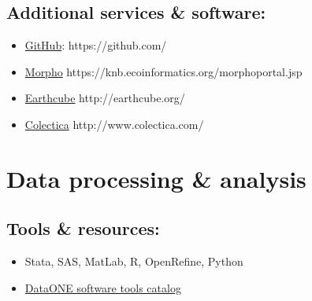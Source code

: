 \documentclass{tufte-handout}
\begin{document}
\subsection{Additional services \& software:}\label{additional-services-software}

\begin{itemize}
\item
  \href{https://github.com/}{GitHub}: https://github.com/
\item
  \href{https://knb.ecoinformatics.org/morphoportal.jsp}{Morpho}
  https://knb.ecoinformatics.org/morphoportal.jsp 
\item
  \href{http://earthcube.org/}{Earthcube} http://earthcube.org/
\item
  \href{http://www.colectica.com/}{Colectica} http://www.colectica.com/
\end{itemize}



\section{Data processing \& analysis}\label{data-processing-analysis}

\subsection{Tools \& resources:}\label{what-tools-and-resources-are-available-1}
\begin{itemize}
\itemsep1pt\parskip0pt
\item
  Stata, SAS, MatLab, R, OpenRefine, Python
\item
  \href{http://www.dataone.org/software_tools_catalog}{DataONE software
  tools catalog}
\end{itemize}
\end{document}
